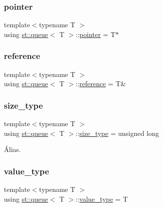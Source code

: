 \subsubsection{\texorpdfstring{pointer}{pointer}}
{\footnotesize\ttfamily template$<$typename T $>$ \\
using \hyperlink{classst_1_1queue}{st\+::queue}$<$ T $>$\+::\hyperlink{classst_1_1queue_ad60e399108ab295c2800f2c415c84de4}{pointer} =  T$\ast$\hspace{0.3cm}{\ttfamily [private]}}

\mbox{\label{classst_1_1queue_a826b47eddf0309ac74beca2f3d1e7b1c}} 
\subsubsection{\texorpdfstring{reference}{reference}}
{\footnotesize\ttfamily template$<$typename T $>$ \\
using \hyperlink{classst_1_1queue}{st\+::queue}$<$ T $>$\+::\hyperlink{classst_1_1queue_a826b47eddf0309ac74beca2f3d1e7b1c}{reference} =  T\&\hspace{0.3cm}{\ttfamily [private]}}

\mbox{\label{classst_1_1queue_adc38745992003842045bb2484ded4861}} 
\subsubsection{\texorpdfstring{size\+\_\+type}{size\_type}}
{\footnotesize\ttfamily template$<$typename T $>$ \\
using \hyperlink{classst_1_1queue}{st\+::queue}$<$ T $>$\+::\hyperlink{classst_1_1queue_adc38745992003842045bb2484ded4861}{size\+\_\+type} =  unsigned long\hspace{0.3cm}{\ttfamily [private]}}



Álias. 

\mbox{\label{classst_1_1queue_a2a0fa1d9b72bfdad9acf67a92146b143}} 
\subsubsection{\texorpdfstring{value\+\_\+type}{value\_type}}
{\footnotesize\ttfamily template$<$typename T $>$ \\
using \hyperlink{classst_1_1queue}{st\+::queue}$<$ T $>$\+::\hyperlink{classst_1_1queue_a2a0fa1d9b72bfdad9acf67a92146b143}{value\+\_\+type} =  T\hspace{0.3cm}{\ttfamily [private]}}




